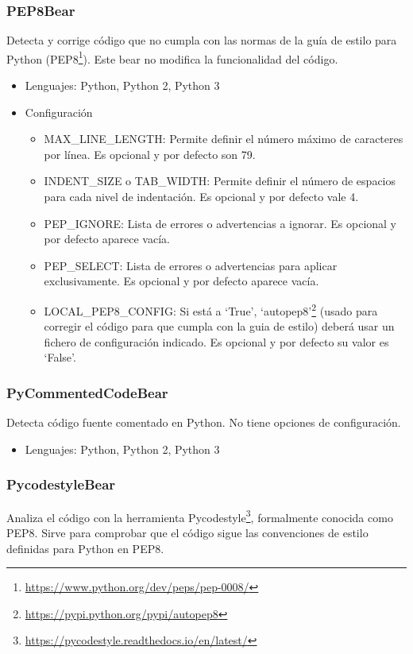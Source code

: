 \documentclass[a4paper, 12pt]{book}
\begin{document}
\subsubsection{PEP8Bear}
\label{sec:seccion1.2.5}
Detecta y corrige código que no cumpla con las normas de la guía de estilo para Python (PEP8\footnote{\url{https://www.python.org/dev/peps/pep-0008/}}). Este bear no modifica la funcionalidad del código.

\begin{itemize}
  \item Lenguajes: Python, Python 2, Python 3
  \item Configuración
    \begin{itemize}
          \item MAX\_LINE\_LENGTH: Permite definir el número máximo de caracteres por línea. Es opcional y por defecto son 79.
          \item INDENT\_SIZE o TAB\_WIDTH: Permite definir el número de espacios para cada nivel de indentación. Es opcional y por defecto vale 4.
          \item PEP\_IGNORE: Lista de errores o advertencias a ignorar. Es opcional y por defecto aparece vacía.
          \item PEP\_SELECT: Lista de errores o advertencias para aplicar exclusivamente. Es opcional y por defecto aparece vacía.
          \item LOCAL\_PEP8\_CONFIG: Si está a `True', `autopep8'\footnote{\url{https://pypi.python.org/pypi/autopep8}} (usado para corregir el código para que cumpla con la guia de estilo) deberá usar un fichero de configuración indicado. Es opcional y por defecto su valor es `False'.
    \end{itemize}
\end{itemize}

\subsubsection{PyCommentedCodeBear}
\label{sec:seccion1.2.6}
Detecta código fuente comentado en Python. No tiene opciones de configuración.

\begin{itemize}
  \item Lenguajes: Python, Python 2, Python 3
\end{itemize}

\subsubsection{PycodestyleBear}
\label{sec:seccion1.2.7}
Analiza el código con la herramienta Pycodestyle\footnote{\url{https://pycodestyle.readthedocs.io/en/latest/}}, formalmente conocida como PEP8. 
Sirve para comprobar que el código sigue las convenciones de estilo definidas para Python en PEP8.
\end{document}
